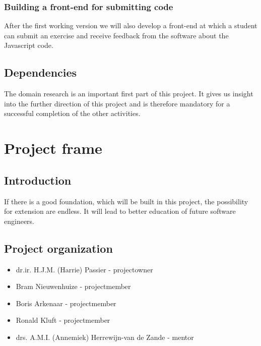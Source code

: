 \documentclass{article}
\begin{document}
\subsubsection{Building a front-end for submitting code}
After the first working version we will also develop a front-end at which a student can submit an exercise and receive feedback from the software about the Javascript code.
\subsection{Dependencies}
The domain research is an important first part of this project. It gives us insight into the further direction of this project and is therefore mandatory for a successful completion of the other activities.

\section{Project frame}

\subsection{Introduction}

If there is a good foundation, which will be built in this project, the possibility for extension are endless. It will lead to better education of future software engineers.  

\subsection{Project organization}

\begin{itemize}
  \item dr.ir. H.J.M. (Harrie) Passier - projectowner
  \item Bram Nieuwenhuize - projectmember
  \item Boris Arkenaar - projectmember
  \item Ronald Kluft - projectmember
  \item drs. A.M.I. (Annemiek) Herrewijn-van de Zande - mentor
\end{itemize}
\end{document}
